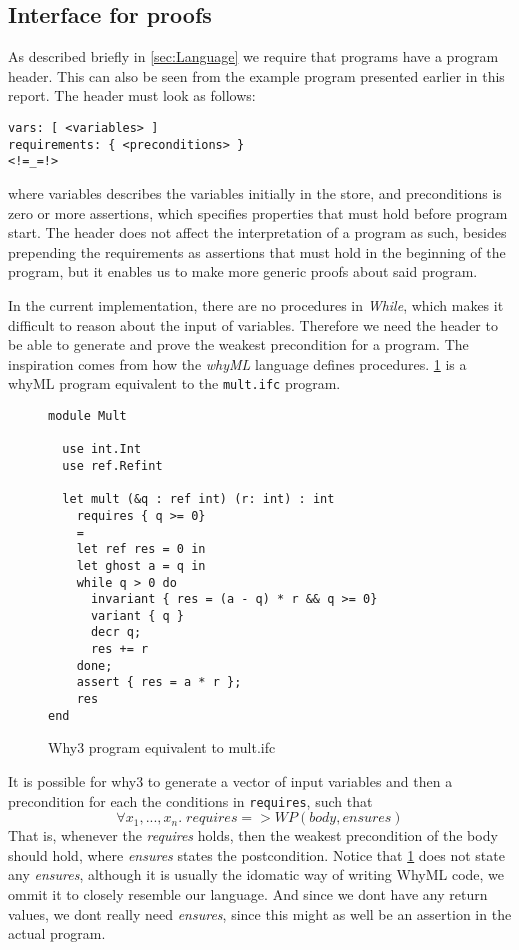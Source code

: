 \subsection{Interface for proofs}\label{sec:interface}
As described briefly in \cref{sec:Language} we require that programs have a program header.
This can also be seen from the example program presented earlier in this report.
The header must look as follows:
\begin{lstlisting}
vars: [ <variables> ]
requirements: { <preconditions> }
<!=_=!>
\end{lstlisting}
where \<variables\> describes the variables initially in the store, and \<preconditions\> is zero or more assertions, which specifies properties that must hold before program start.
The header does not affect the interpretation of a program as such, besides prepending the requirements as assertions that must hold in the beginning of the program, but it enables us to make more generic proofs about said program.

In the current implementation, there are no procedures in \textit{While}, which makes it difficult to reason about the input of variables.
Therefore we need the header to be able to generate and prove the weakest precondition for a program.
The inspiration comes from how the \textit{whyML} language defines procedures.
\cref{fig:why3} is a whyML program equivalent to the \texttt{mult.ifc} program.

\begin{figure}[h]
\begin{lstlisting}
module Mult

  use int.Int
  use ref.Refint

  let mult (&q : ref int) (r: int) : int
    requires { q >= 0}
    =
    let ref res = 0 in
    let ghost a = q in
    while q > 0 do
      invariant { res = (a - q) * r && q >= 0}
      variant { q }
      decr q;
      res += r
    done;
    assert { res = a * r };
    res
end
\end{lstlisting}
\caption{Why3 program equivalent to mult.ifc}
\label{fig:why3}
\end{figure}

It is possible for why3 to generate a vector of input variables and then a precondition for each the conditions in \texttt{requires}, such that 
$$\forall x_{1},...,x_{n}. \; requires => WP(body, ensures)$$
That is, whenever the \textit{requires} holds, then the weakest precondition of the body should hold, where \textit{ensures} states the postcondition.
Notice that \cref{fig:why3} does not state any \textit{ensures}, although it is usually the idomatic way of writing WhyML code, we ommit it to closely resemble our language.
And since we dont have any return values, we dont really need \textit{ensures}, since this might as well be an assertion in the actual program.
